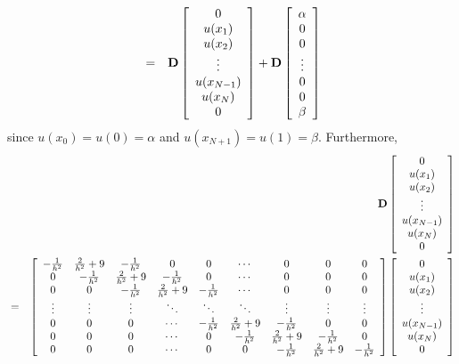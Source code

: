 \begin{solution}
\begin{enumerate}
\begin{eqnarray*}
\\
&=&{\bf D}\left[\begin{array}{c} 0 \\ u(x_1) \\u(x_2) \\ \vdots \\ u(x_{N-1}) \\ u(x_N) \\ 0 \end{array}\right]+{\bf D}\left[\begin{array}{c} \alpha \\ 0 \\ 0 \\ \vdots \\ 0 \\ 0 \\ \beta \end{array}\right]
\end{eqnarray*}
since $u(x_0)=u(0)=\alpha$ and $u(x_{N+1})=u(1)=\beta$. Furthermore,
\begin{eqnarray*}
&&\BD\left[\begin{array}{c} 0 \\ u(x_1) \\u(x_2) \\ \vdots \\ u(x_{N-1}) \\ u(x_N) \\ 0 \end{array}\right]
\\
&=&\left[\begin{array}{ccccccccc} 
-\frac{1}{h^2} & \frac{2}{h^2}+9 & -\frac{1}{h^2} & 0 & 0 & \cdots & 0 & 0 & 0
\\
0 & -\frac{1}{h^2} & \frac{2}{h^2}+9 & -\frac{1}{h^2} & 0 & \cdots & 0 & 0 & 0
\\
0 & 0 & -\frac{1}{h^2} & \frac{2}{h^2}+9 & -\frac{1}{h^2} & \cdots & 0 & 0 & 0
\\
\vdots & \vdots & \vdots & \ddots & \ddots & \ddots & \vdots & \vdots & \vdots
\\
0 & 0 & 0 & \cdots & -\frac{1}{h^2} & \frac{2}{h^2}+9 & -\frac{1}{h^2} & 0 & 0
\\
0 & 0  & 0 & \cdots & 0 & -\frac{1}{h^2} & \frac{2}{h^2}+9 & -\frac{1}{h^2} & 0
\\
0 & 0 & 0 & \cdots & 0 & 0 & -\frac{1}{h^2} & \frac{2}{h^2}+9 & -\frac{1}{h^2}
 \end{array}\right]
\left[\begin{array}{c} 0 \\ u(x_1) \\u(x_2) \\ \vdots \\ u(x_{N-1}) \\ u(x_N) \\ 0 \end{array}\right]

\end{eqnarray*}
\end{enumerate}
\end{solution}
